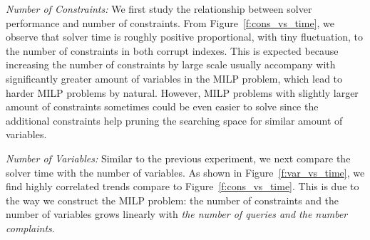 \smallskip
\emph{Number of Constraints: } We first study the relationship between solver performance and number of constraints.   From Figure~\ref{f:cons_vs_time}, we observe that solver time is roughly positive proportional, with tiny fluctuation, to the number of constraints in both corrupt indexes. This is expected because increasing the number of constraints by large scale usually accompany with significantly greater amount of variables in the MILP problem, which lead to harder MILP problems by natural. However, MILP problems  with slightly larger amount of constraints sometimes could be even easier to solve since the additional constraints help pruning the searching space for similar amount of variables.

\smallskip
\emph{Number of Variables: } Similar to the previous experiment, we next compare the solver time with the number of variables. As shown in Figure~\ref{f:var_vs_time}, we find highly correlated trends compare to Figure~\ref{f:cons_vs_time}. 
This is due to the way we construct the MILP problem: the number of constraints and the number of variables grows linearly with \textit{the number of queries and the number complaints}.  


